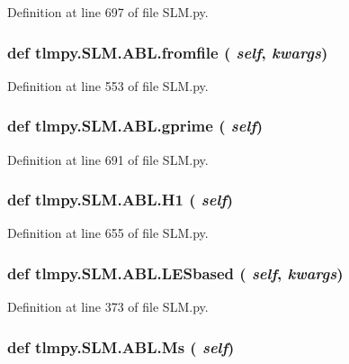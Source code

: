 Definition at line 697 of file SLM.py.\hypertarget{classtlmpy_1_1SLM_1_1ABL_ac5941b9a426be1c1c410966486d26625}{
\subsubsection[{fromfile}]{\setlength{\rightskip}{0pt plus 5cm}def tlmpy.SLM.ABL.fromfile ( {\em self}, \/   {\em kwargs})}}
\label{classtlmpy_1_1SLM_1_1ABL_ac5941b9a426be1c1c410966486d26625}


Definition at line 553 of file SLM.py.\hypertarget{classtlmpy_1_1SLM_1_1ABL_a12fc941483f473a05a78b81bc1a173be}{
\subsubsection[{gprime}]{\setlength{\rightskip}{0pt plus 5cm}def tlmpy.SLM.ABL.gprime ( {\em self})}}
\label{classtlmpy_1_1SLM_1_1ABL_a12fc941483f473a05a78b81bc1a173be}


Definition at line 691 of file SLM.py.\hypertarget{classtlmpy_1_1SLM_1_1ABL_abd7ec5234efaa7eb8104f4050510ab1a}{
\subsubsection[{H1}]{\setlength{\rightskip}{0pt plus 5cm}def tlmpy.SLM.ABL.H1 ( {\em self})}}
\label{classtlmpy_1_1SLM_1_1ABL_abd7ec5234efaa7eb8104f4050510ab1a}


Definition at line 655 of file SLM.py.\hypertarget{classtlmpy_1_1SLM_1_1ABL_a77e5c46b2b5eac7b1ea0c14fe06e4145}{
\subsubsection[{LESbased}]{\setlength{\rightskip}{0pt plus 5cm}def tlmpy.SLM.ABL.LESbased ( {\em self}, \/   {\em kwargs})}}
\label{classtlmpy_1_1SLM_1_1ABL_a77e5c46b2b5eac7b1ea0c14fe06e4145}


Definition at line 373 of file SLM.py.\hypertarget{classtlmpy_1_1SLM_1_1ABL_af125d406825aaab9e870e5550ff33319}{
\subsubsection[{Ms}]{\setlength{\rightskip}{0pt plus 5cm}def tlmpy.SLM.ABL.Ms ( {\em self})}}
\label{classtlmpy_1_1SLM_1_1ABL_af125d406825aaab9e870e5550ff33319}


